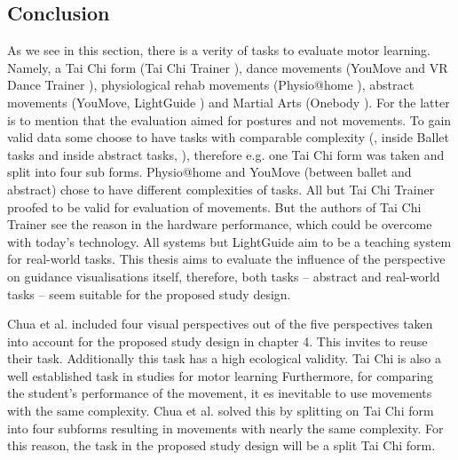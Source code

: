\subsection{Conclusion}
As we see in this section, there is a verity of tasks to evaluate motor learning. Namely, a Tai Chi form (Tai Chi Trainer \cite{Chua2003}), dance movements (YouMove \cite{Anderson2013a} and VR Dance Trainer \cite{Chan2010}), physiological rehab movements (Physio@home \cite{Tang2015}), abstract movements (YouMove, LightGuide \cite{Sodhi2012}) and Martial Arts (Onebody \cite{Hoang2016}). For the latter is to mention that the evaluation aimed for postures and not movements. To gain valid data some choose to have tasks with comparable complexity (\cite{Chua2003}, \cite{Anderson2013a} inside Ballet tasks and inside abstract tasks, \cite{Sodhi2012}), therefore e.g. one Tai Chi form was taken and split into four sub forms. Physio@home and YouMove (between ballet and abstract) chose to have different complexities of tasks. All but Tai Chi Trainer proofed to be valid for evaluation of movements. But the authors of Tai Chi Trainer see the reason in the hardware performance, which could be overcome with today's technology. All systems but LightGuide aim to be a teaching system for real-world tasks. This thesis aims to evaluate the influence of the perspective on guidance visualisations itself, therefore, both tasks \--- abstract and real-world tasks \--- seem suitable for the proposed study design.
\begin{tcolorbox}[colback=red!30!white]
Chua et al. included four visual perspectives out of the five perspectives taken into account for the proposed study design in chapter 4. This invites to reuse their task. Additionally this task has a high ecological validity. Tai Chi is also a well established task in studies for motor learning \cite{Komura2006, Anderson2013a, Han2017} Furthermore, for comparing the student's performance of the movement, it es inevitable to use movements with the same complexity. Chua et al. solved this by splitting on Tai Chi form into four subforms resulting in movements with nearly the same complexity. For this reason, the task in the proposed study design will be a split Tai Chi form. 
\end{tcolorbox}

\newpage
